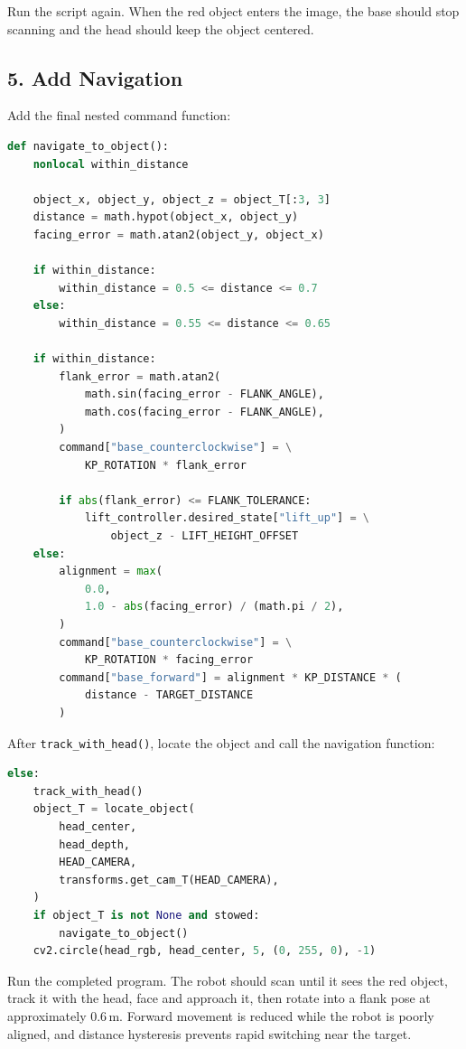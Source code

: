 \documentclass[11pt,a4paper]{article}
\begin{document}
Run the script again. When the red object enters the image, the base should
stop scanning and the head should keep the object centered.

\subsection*{5. Add Navigation}

Add the final nested command function:

\begin{lstlisting}[language=Python]
def navigate_to_object():
    nonlocal within_distance

    object_x, object_y, object_z = object_T[:3, 3]
    distance = math.hypot(object_x, object_y)
    facing_error = math.atan2(object_y, object_x)

    if within_distance:
        within_distance = 0.5 <= distance <= 0.7
    else:
        within_distance = 0.55 <= distance <= 0.65

    if within_distance:
        flank_error = math.atan2(
            math.sin(facing_error - FLANK_ANGLE),
            math.cos(facing_error - FLANK_ANGLE),
        )
        command["base_counterclockwise"] = \
            KP_ROTATION * flank_error

        if abs(flank_error) <= FLANK_TOLERANCE:
            lift_controller.desired_state["lift_up"] = \
                object_z - LIFT_HEIGHT_OFFSET
    else:
        alignment = max(
            0.0,
            1.0 - abs(facing_error) / (math.pi / 2),
        )
        command["base_counterclockwise"] = \
            KP_ROTATION * facing_error
        command["base_forward"] = alignment * KP_DISTANCE * (
            distance - TARGET_DISTANCE
        )
\end{lstlisting}

After \texttt{track\_with\_head()}, locate the object and call the navigation
function:

\begin{lstlisting}[language=Python]
else:
    track_with_head()
    object_T = locate_object(
        head_center,
        head_depth,
        HEAD_CAMERA,
        transforms.get_cam_T(HEAD_CAMERA),
    )
    if object_T is not None and stowed:
        navigate_to_object()
    cv2.circle(head_rgb, head_center, 5, (0, 255, 0), -1)
\end{lstlisting}

Run the completed program. The robot should scan until it sees the red object,
track it with the head, face and approach it, then rotate into a flank pose at
approximately $0.6$\,m. Forward movement is reduced while the robot is poorly
aligned, and distance hysteresis prevents rapid switching near the target.
\end{document}
